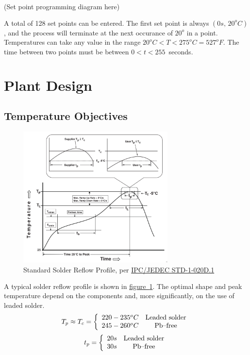 \documentclass[10pt, twocolumn]{article}
\begin{document}
(Set point programming diagram here)

A total of 128 set points can be entered. The first set point is always $(0s,\,20^{o}C)$,
and the process will terminate at the next occurance of $20^{o}$ in a point.
Temperatures can take any value in the range \mbox{$20^{o}C<T<275^{o}C=527^{o}F$.}
The time between two points must be between \mbox{$0<t<255$ seconds.}

\section{Plant Design}

\subsection{Temperature Objectives}

\begin{figure}
	\centering
	\includegraphics[width=0.7\textwidth]{Figures/standard-reflow-profile.pdf}
	\caption{Standard Solder Reflow Profile, per \href{J-STD-020D-1.pdf}{IPC/JEDEC STD-1-020D.1}}
	\label{standard-reflow-profile}
\end{figure}

A typical solder reflow profile is shown in
\hyperref[standard-reflow-profile]{\mbox{figure \ref{standard-reflow-profile}}}.
The optimal shape and peak temperature depend on the components and,
more significantly, on the use of leaded solder.
\begin{equation*}
T_{p}\approx T_{c}=\left\{\begin{array}{c c}
220-235^{o}C	&\textrm{Leaded solder}	\\
245-260^{o}C	&\textrm{Pb--free}	\\
\end{array}\right.
\end{equation*}
\begin{equation*}
t_{p}=\left\{\begin{array}{c c}
20s	&\textrm{Leaded solder}	\\
30s	&\textrm{Pb--free}	\\
\end{array}\right.
\end{equation*}
\end{document}
